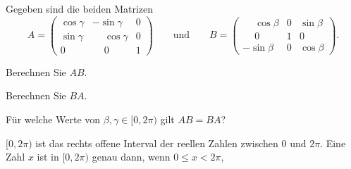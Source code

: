 Gegeben sind die beiden Matrizen
\[
A
=
\begin{pmatrix}
\cos\gamma&         - \sin\gamma&0\\
\sin\gamma&\phantom{-}\cos\gamma&0\\
    0     &\phantom{-}    0     &1
\end{pmatrix}
\qquad\text{und}\qquad
B
=
\begin{pmatrix}
\phantom{-}\cos\beta&0&\sin\beta\\
\phantom{-}    0    &1&    0    \\
         - \sin\beta&0&\cos\beta
\end{pmatrix}.
\]
\begin{teilaufgaben}
\item Berechnen Sie $AB$.
\item Berechnen Sie $BA$.
\item Für welche Werte von $\beta,\gamma\in[0,2\pi)$ gilt
$AB=BA$?
\end{teilaufgaben}


\begin{hinweis}
$[0,2\pi)$ ist das rechts offene Interval der reellen Zahlen zwischen 
$0$ und $2\pi$.
Eine Zahl $x$ ist in $[0,2\pi)$ genau dann,
wenn $0\le x<2\pi$,
\end{hinweis}

